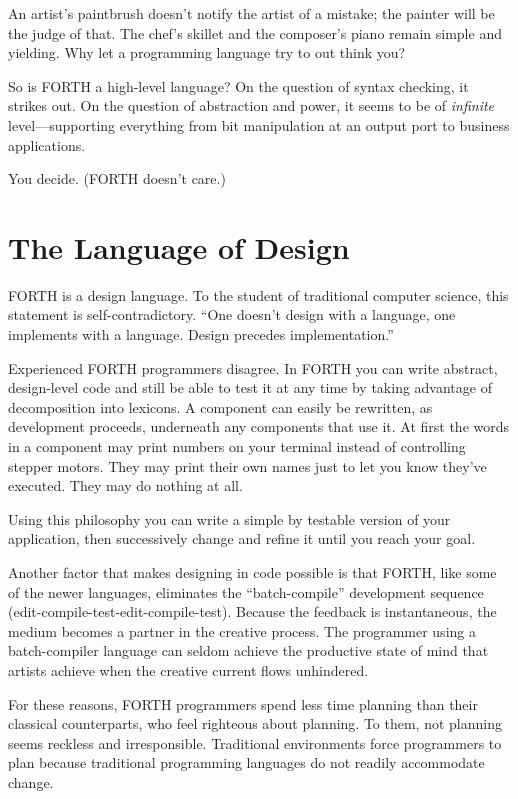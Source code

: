 An artist's paintbrush doesn't notify the artist of a mistake; the
painter will be the judge of that. The chef's skillet and the
composer's piano remain simple and yielding. Why let a programming
language try to out think you?

So is FORTH a high-level language? On the question of syntax checking,
it strikes out. On the question of abstraction and power, it seems to
be of \emph{infinite} level---supporting everything from bit
manipulation at an output port to business applications.

You decide. (FORTH doesn't care.)


\section{The Language of Design}

FORTH is a design language. To the student of traditional computer
science, this statement is self-contradictory. ``One doesn't design
with a language, one implements with a language.  Design precedes
implementation.''

Experienced FORTH programmers disagree. In FORTH you can write
abstract, design-level code and still be able to test it at any time
by taking advantage of decomposition into lexicons. A component can
easily be rewritten, as development proceeds, underneath any
components that use it. At first the words in a component may print
numbers on your terminal instead of controlling stepper motors. They
may print their own names just to let you know they've executed. They
may do nothing at all.

Using this philosophy you can write a simple by testable version of
your application, then successively change and refine it until you
reach your goal.

Another factor that makes designing in code possible is that FORTH,
like some of the newer languages, eliminates the ``batch-compile''
development sequence (edit-compile-test-edit-compile-test). Because
the feedback is instantaneous, the medium becomes a partner in the
creative process. The programmer using a batch-compiler language can
seldom achieve the productive state of mind that artists achieve when
the creative current flows unhindered.

For these reasons, FORTH programmers spend less time planning than
their classical counterparts, who feel righteous about planning. To
them, not planning seems reckless and irresponsible. Traditional
environments force programmers to plan because traditional programming
languages do not readily accommodate change.

